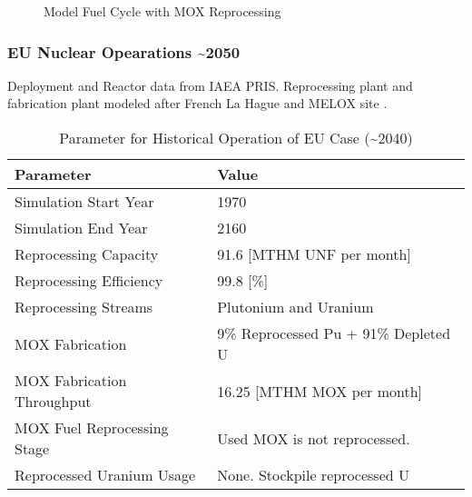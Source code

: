 \begin{frame}
\begin{figure}
\begin{adjustbox}{max totalsize={0.9\textwidth}{.8\textheight}, center}
                \end{adjustbox}
                
                \caption{Model Fuel Cycle with \gls{MOX} Reprocessing}
                \label{diag:fc}
\end{figure}
\end{frame}

\begin{frame}
    \frametitle{EU Nuclear Opearations \textasciitilde 2050}
    Deployment and Reactor data from \gls{IAEA} \gls{PRIS}.
    Reprocessing plant and fabrication plant modeled after French La Hague and MELOX site
    \cite{schneider_spent_2008, hugelmann_melox_1999}.
        
\begin{table}[h]
    \centering
    \begin{tabularx}{\textwidth}{bb}
        \hline
        Parameter & Value \\
        \hline
        Simulation Start Year & 1970   \\
        Simulation End Year & 2160  \\ 
        Reprocessing Capacity & 91.6 [MTHM \gls{UNF} per month] \cite{schneider_spent_2008}  \\
        Reprocessing Efficiency & 99.8 [\%] \\
        Reprocessing Streams & Plutonium and Uranium  \\
        \gls{MOX} Fabrication & \small{9\% Reprocessed Pu + 91\% Depleted U} \\
        \gls{MOX} Fabrication Throughput & 16.25 [MTHM \gls{MOX} per month]  \cite{hugelmann_melox_1999} \\
        \gls{MOX} Fuel Reprocessing Stage &  Used \gls{MOX} is not reprocessed. \\  
        Reprocessed Uranium Usage &  None. Stockpile reprocessed U \\
        \hline
    \end{tabularx}
    \caption {Parameter for Historical Operation of \gls{EU} Case (\textasciitilde 2040)}
    \label{tab:sim_eu}
\end{table}
    
\end{frame}

